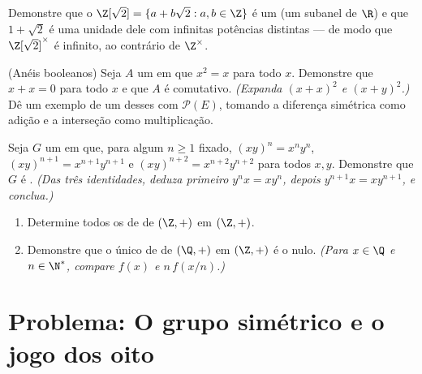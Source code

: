 \begin{exercise}[$\star\star$]\label{exo:b1:structures:9}
Demonstre que o  $\Z[\sqrt 2] = \{a + b\sqrt 2 : a, b \in \Z\}$ é
um  (um subanel de $\R$) e que $1 + \sqrt 2$ é uma unidade dele
com infinitas potências distintas --- de modo que $\Z[\sqrt 2]^\times$ é
infinito, ao contrário de $\Z^\times$.
\end{exercise}

\begin{exercise}[$\star\star\star$]\label{exo:b1:structures:10}
(Anéis booleanos) Seja $A$ um  em que $x^2 = x$ para todo $x$.
Demonstre que $x + x = 0$ para todo $x$ e que $A$ é comutativo.
\emph{(Expanda $(x+x)^2$ e $(x+y)^2$.)} Dê um exemplo de um  desses
com $\mathcal{P}(E)$, tomando a diferença simétrica como
adição e a interseção como multiplicação.
\end{exercise}

\begin{exercise}[$\star\star\star$]\label{exo:b1:structures:11}
Seja $G$ um  em que, para algum $n \geq 1$ fixado, $(xy)^n =
x^n y^n$, $(xy)^{n+1} = x^{n+1}y^{n+1}$ e $(xy)^{n+2} =
x^{n+2}y^{n+2}$ para todos $x, y$. Demonstre que $G$ é .
\emph{(Das três identidades, deduza primeiro $y^n x = x y^n$, depois
$y^{n+1} x = x y^{n+1}$, e conclua.)}
\end{exercise}

\begin{exercise}[$\star\star$]\label{exo:b1:structures:12}
\begin{enumerate}
  \item Determine todos os  de  de $(\Z, +)$ em $(\Z, +)$.
  \item Demonstre que o único  de  de $(\Q, +)$ em
        $(\Z, +)$ é o  nulo. \emph{(Para $x \in \Q$ e
        $n \in \N^*$, compare $f(x)$ e $n\,f(x/n)$.)}
\end{enumerate}
\end{exercise}

\section{Problema: O grupo simétrico e o jogo dos oito}

